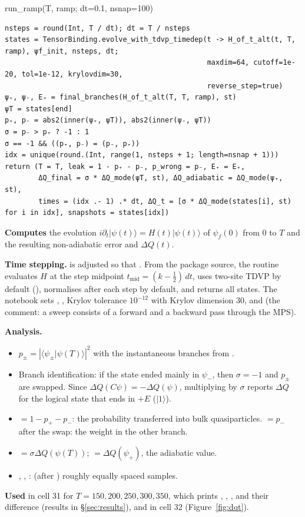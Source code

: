 \documentclass[11pt]{article}
\newcommand{\ket}[1]{\lvert #1\rangle}
\begin{document}
\begin{function}{run\_ramp(T, ramp; dt=0.1, nsnap=100)}
\begin{Verbatim}
nsteps = round(Int, T / dt); dt = T / nsteps
states = TensorBinding.evolve_with_tdvp_timedep(t -> H_of_t_alt(t, T, ramp), ψf_init, nsteps, dt;
                                                maxdim=64, cutoff=1e-20, tol=1e-12, krylovdim=30,
                                                reverse_step=true)
ψ₊, ψ₋, E₊ = final_branches(H_of_t_alt(T, T, ramp), st)
ψT = states[end]
p₊, p₋ = abs2(inner(ψ₊, ψT)), abs2(inner(ψ₋, ψT))
σ = p₋ > p₊ ? -1 : 1
σ == -1 && ((p₊, p₋) = (p₋, p₊))
idx = unique(round.(Int, range(1, nsteps + 1; length=nsnap + 1)))
return (T = T, leak = 1 - p₊ - p₋, p_wrong = p₋, E₊ = E₊,
        ΔQ_final = σ * ΔQ_mode(ψT, st), ΔQ_adiabatic = ΔQ_mode(ψ₊, st),
        times = (idx .- 1) .* dt, ΔQ_t = [σ * ΔQ_mode(states[i], st) for i in idx], snapshots = states[idx])
\end{Verbatim}
\textbf{Computes} the evolution $i\partial_t\ket{\psi(t)}=H(t)\ket{\psi(t)}$ of $\psi_f(0)$ from $0$ to $T$ and the
resulting non-adiabatic error and $\Delta Q(t)$.

\textbf{Time stepping.}  is adjusted so that . From the package source, the routine
\linebreak[3] evaluates $H$ at the step midpoint $t_{\text{mid}}=(k-\tfrac12)\,dt$, uses two-site
TDVP by default (), normalises after each step by default, and returns all  states.
The notebook sets , , Krylov tolerance $10^{-12}$ with Krylov dimension 30,
and  (the comment: a sweep consists of a forward and a backward pass through the MPS).

\textbf{Analysis.}
\begin{itemize}
\item $p_\pm = |\langle\psi_\pm\vert\psi(T)\rangle|^2$ with the instantaneous branches from .
\item Branch identification: if the state ended mainly in $\psi_-$, then $\sigma=-1$ and $p_\pm$ are swapped. Since
      $\Delta Q(C\psi)=-\Delta Q(\psi)$, multiplying by $\sigma$ reports $\Delta Q$ for the logical state that ends in
      $+E$ ($\ket{1}$).
\item {} $=1-p_+-p_-$: the probability transferred into bulk quasiparticles.
       $=p_-$ after the swap: the weight in the other branch.
\item {} $=\sigma\Delta Q(\psi(T))$;  $=\Delta Q(\psi_+)$, the adiabatic value.
\item {}, , :  (after ) roughly equally spaced
      samples.
\end{itemize}
\textbf{Used} in cell 31 for $T=150,200,250,300,350$, which prints , , ,
 and their difference (results in \S\ref{sec:results}), and in cell 32 (Figure~\ref{fig:dqt}).
\end{function}
\end{document}
